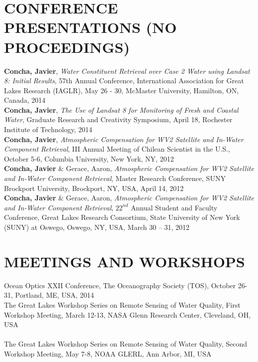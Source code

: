 \documentclass[11pt]{res} %
\begin{document}
\begin{resume}
\vspace{-0.1in}
\section{CONFERENCE PRESENTATIONS (NO PROCEEDINGS)}
\vspace{0.1in}
{\bf Concha, Javier}, {\it Water Constituent Retrieval over Case 2 Water using Landsat 8: Initial Results}, 57th Annual Conference, International Association for Great Lakes Research (IAGLR), May 26 - 30, McMaster University, Hamilton, ON, Canada, 2014
\vspace{0.1in}\\
{\bf Concha, Javier}, {\it The Use of Landsat 8 for Monitoring of Fresh and Coastal Water}, Graduate Research and Creativity Symposium, April 18, Rochester Institute of Technology, 2014
\vspace{0.1in}\\
{\bf Concha, Javier}, {\it Atmospheric Compensation for WV2 Satellite and In-Water Component Retrieval}, III Annual Meeting of Chilean Scientist in the U.S., October 5-6, Columbia University, New York, NY, 2012
\vspace{0.1in}\\
{\bf Concha, Javier} $\&$ Gerace, Aaron, {\it Atmospheric Compensation for WV2 Satellite and In-Water Component Retrieval}, Master Research Conference, SUNY Brockport University, Brockport, NY, USA, April 14, 2012
\vspace{0.1in}\\
{\bf Concha, Javier} $\&$ Gerace, Aaron, {\it Atmospheric Compensation for WV2 Satellite and In-Water Component Retrieval}, $22^{nd}$ Annual Student and Faculty Conference, Great Lakes Research Consortium, State University of New York (SUNY) at Oswego, Oswego, NY, USA, March 30 -- 31, 2012\\

\vspace{-0.1in}
\section{MEETINGS AND WORKSHOPS}
\vspace{0.1in}
Ocean Optics XXII Conference, The Oceanography Society (TOS),  October 26-31, Portland, ME, USA, 2014
\vspace{0.1in}\\
The Great Lakes Workshop Series on Remote Sensing of Water Quality, First Workshop Meeting, March 12-13, NASA Glenn Research Center, Cleveland, OH, USA\\
\vspace{0.1in}\\
The Great Lakes Workshop Series on Remote Sensing of Water Quality, Second Workshop Meeting, May 7-8, NOAA GLERL, Ann Arbor, MI, USA\\


\end{resume}
\end{document}
